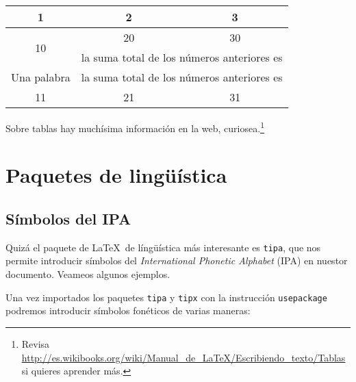 \documentclass[a4paper]{article}
\begin{document}
\vspace{0.5cm} %


\begin{tabular}{| c | c | c |}
    \hline
    1 & 2 & 3 \\
    \hline
    
    \multirow{2}{*}{10} & 20 & 30 \\
    \cline{2-3} %
    
    & \multicolumn{2}{r|}{la suma total de los números anteriores es}\\

    \hline
    
    Una palabra & \multicolumn{2}{c|}{la suma total de los números anteriores es}\\

    \hline

    11 & 21 & 31\\
    \hline

\end{tabular}

\vspace{0.5cm} %

Sobre tablas hay muchísima información en la web, curiosea.\footnote{Revisa 
\url{http://es.wikibooks.org/wiki/Manual_de_LaTeX/Escribiendo_texto/Tablas} si quieres aprender más.}

\section{Paquetes de lingüística}
\label{ling}


\subsection{Símbolos del IPA}
\label{ipa}

\begin{center}
\end{center}


Quizá el paquete de \LaTeX\ de língüística más interesante es \texttt{tipa}, que nos permite introducir símbolos del \textit{International Phonetic Alphabet} (IPA) en nuestor documento. Veameos algunos ejemplos.

Una vez importados los paquetes \texttt{tipa} y \texttt{tipx} con la instrucción \texttt{usepackage} podremos introducir símbolos fonéticos de varias maneras: 
\end{document}
